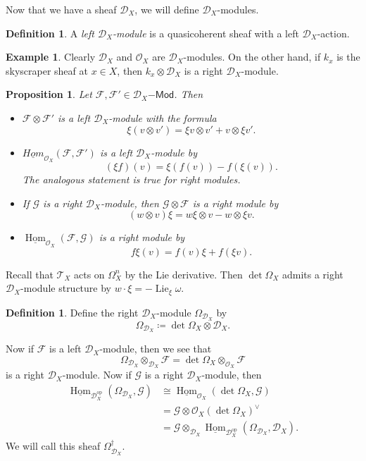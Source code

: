 \documentclass[leqno, openany]{memoir}
\newtheorem{prop}[thm]{Proposition}
\theoremstyle{definition}
\newtheorem{defn}[thm]{Definition}
\newtheorem{exm}[thm]{Example}
\theoremstyle{remark}
\theoremstyle{plain}
\theoremstyle{definition}
\theoremstyle{remark}
\newcommand{\mc}[1]{\mathcal{#1}}
\newcommand{\mr}[1]{\mathrm{#1}}
\newcommand{\on}[1]{\operatorname{#1}}
\newcommand{\ms}[1]{\mathsf{#1}}
\newcommand{\ul}[1]{\underline{#1}}
\DeclareMathOperator{\Hom}{Hom}
\begin{document}
Now that we have a sheaf $\mc{D}_X$, we will define $\mc{D}_X$-modules.
\begin{defn}
    A \textit{left $\mc{D}_X$-module} is a quasicoherent sheaf with a left $\mc{D}_X$-action.
\end{defn}

\begin{exm}
    Clearly $\mc{D}_X$ and $\mc{O}_X$ are $\mc{D}_X$-modules. On the other hand, if $k_x$ is the skyscraper sheaf at $x \in X$, then $k_x \otimes \mc{D}_X$ is a right $\mc{D}_X$-module.
\end{exm}

\begin{prop}
    Let $\mc{F}, \mc{F}' \in \mc{D}_X\ms{-Mod}$. Then
    \begin{itemize}
        \item $\mc{F} \otimes \mc{F}'$ is a left $\mc{D}_X$-module with the formula
            \[ \xi(v \otimes v') = \xi v \otimes v' + v \otimes \xi v'. \]
        \item $\ul{Hom}_{\mc{O}_X}(\mc{F}, \mc{F}')$ is a left $\mc{D}_X$-module by
            \[ (\xi f)(v) = \xi(f(v)) - f(\xi(v)). \]
            The analogous statement is true for right modules.
        \item If $\mc{G}$ is a right $\mc{D}_X$-module, then $\mc{G} \otimes \mc{F}$ is a right module by
            \[ (w \otimes v) \xi = w \xi \otimes v - w \otimes \xi v. \]
        \item $\ul{\Hom}_{\mc{O}_X}(\mc{F}, \mc{G})$ is a right module by
            \[ f \xi(v) = f(v) \xi + f(\xi v). \]
    \end{itemize}
\end{prop}

Recall that $\mc{T}_X$ acts on $\Omega^n_X$ by the Lie derivative. Then $\det \Omega_X$ admits a right $\mc{D}_X$-module structure by $w \cdot \xi = - \on{Lie}_{\xi} \omega$.

\begin{defn}
    Define the right $\mc{D}_X$-module $\Omega_{\mc{D}_X}$ by
    \[ \Omega_{\mc{D}_X} \coloneqq \det \Omega_X \otimes \mc{D}_X. \]
\end{defn}

Now if $\mc{F}$ is a left $\mc{D}_X$-module, then we see that 
\[ \Omega_{\mc{D}_X} \otimes_{\mc{D}_X} \mc{F} = \det \Omega_X \otimes_{\mc{O}_X} \mc{F} \]
is a right $\mc{D}_X$-module. Now if $\mc{G}$ is a right $\mc{D}_X$-module, then
\begin{align*}
    \ul{\Hom}_{\mc{D}_X^{\mr{op}}}(\Omega_{\mc{D}_X}, \mc{G}) &\cong \ul{\Hom}_{\mc{O}_X}(\det \Omega_X, \mc{G}) \\
    &= \mc{G} \otimes \mc{O}_X (\det \Omega_X)^{\vee} \\
    &= \mc{G} \otimes_{\mc{D}_X} \ul{\Hom}_{\mc{D}_X^{\mr{op}}}(\Omega_{\mc{D}_X}, \mc{D}_X).
\end{align*}
We will call this sheaf $\Omega_{\mc{D}_X}^{\dag}$.
\end{document}
